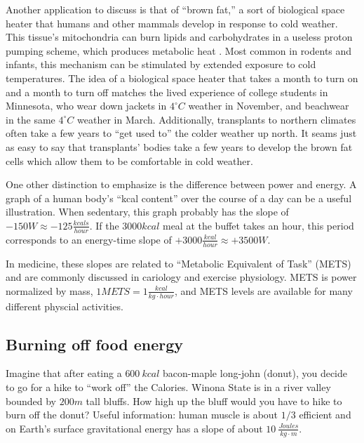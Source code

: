 \documentclass[12pt]{iopart}
\newcommand{\degC}{^{\circ}C}
\begin{document}
Another application to discuss is that of ``brown fat,'' a sort of biological space heater that humans and other mammals develop in response to cold weather.  This tissue's mitochondria can burn lipids and carbohydrates in a useless proton pumping scheme, which produces metabolic heat \cite{brown_fat}.  Most common in rodents and infants, this mechanism can be stimulated by extended exposure to cold temperatures.  The idea of a biological space heater that takes a month to turn on and a month to turn off matches the lived experience of college students in Minnesota, who wear down jackets in $4\degC$ weather in November, and beachwear in the same $4\degC$ weather in March.  Additionally, transplants to northern climates often take a few years to ``get used to'' the colder weather up north. It seams just as easy to say that transplants' bodies take a few years to develop the brown fat cells which allow them to be comfortable in cold weather.

One other distinction to emphasize is the difference between power and energy.  A graph of a human body's ``kcal content'' over the course of a day can be a useful illustration.  When sedentary, this graph probably has the slope of $-150W\approx -125 \frac{kcals}{hour}$.  If the $3000kcal$ meal at the buffet takes an hour, this period corresponds to an energy-time slope of $+3000\frac{kcal}{hour}\approx +3500W$.  

In medicine, these slopes are related to ``Metabolic Equivalent of Task'' (METS) and are commonly discussed in cariology and exercise physiology.  METS is power normalized by mass, $1METS=1\frac{kcal}{kg\cdot hour}$, and METS levels are available for many different physcial activities. \cite{METS}

\subsection{Burning off food energy}
Imagine that after eating a $600~kcal$ bacon-maple long-john (donut), you decide to go for a hike to ``work off'' the Calories.  Winona State  is in a river valley bounded by $200m$ tall bluffs.  How high up the bluff would you have to hike to burn off the donut?  
Useful information: human muscle is about $1/3$ efficient and on Earth's surface gravitational energy has a slope of about $10~\frac{Joules}{kg\cdot m}$.
\end{document}

